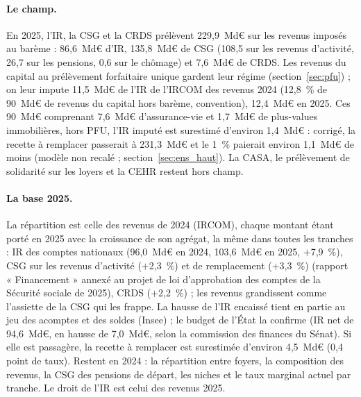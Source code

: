 \documentclass[11pt,a4paper]{article}
\begin{document}
\paragraph{Le champ.} En 2025, l'IR, la CSG et la CRDS prélèvent 229,9~Md€ sur les revenus imposés au barème : 86,6~Md€
d'IR, 135,8~Md€ de CSG (108,5 sur les revenus d'activité, 26,7 sur les pensions, 0,6 sur le chômage) et 7,6~Md€ de CRDS.
Les revenus du capital au prélèvement forfaitaire unique gardent leur régime (section~\ref{sec:pfu}) ; on leur impute
11,5~Md€ de l'IR de l'IRCOM des revenus 2024 (12,8~\% de 90~Md€ de revenus du capital hors barème, convention), 12,4~Md€
en 2025. Ces 90~Md€ comprenant 7,6~Md€ d'assurance-vie et 1,7~Md€ de plus-values immobilières, hors PFU, l'IR imputé est
surestimé d'environ 1,4~Md€ : corrigé, la recette à remplacer passerait à 231,3~Md€ et le 1~\% paierait environ 1,1~Md€
de moins (modèle non recalé ; section~\ref{sec:ens_haut}). La CASA, le prélèvement de solidarité sur les loyers et la
CEHR restent hors champ.

\paragraph{La base 2025.} La répartition est celle des revenus de 2024 (IRCOM), chaque montant étant porté en 2025 avec
la croissance de son agrégat, la même dans toutes les tranches : IR des comptes nationaux (96,0~Md€ en 2024, 103,6~Md€
en 2025, $+$7,9~\%), CSG sur les revenus d'activité ($+$2,3~\%) et de remplacement ($+$3,3~\%) (rapport « Financement »
annexé au projet de loi d'approbation des comptes de la Sécurité sociale de 2025), CRDS ($+$2,2~\%) ; les revenus
grandissent comme l'assiette de la CSG qui les frappe. La hausse de l'IR encaissé tient en partie au jeu des acomptes et
des soldes (Insee) ; le budget de l'État la confirme (IR net de 94,6~Md€, en hausse de 7,0~Md€, selon la commission des
finances du Sénat). Si elle est passagère, la recette à remplacer est surestimée d'environ 4,5~Md€ (0,4 point de taux).
Restent en 2024 : la répartition entre foyers, la composition des revenus, la CSG des pensions de départ, les niches et
le taux marginal actuel par tranche. Le droit de l'IR est celui des revenus 2025.
\end{document}

